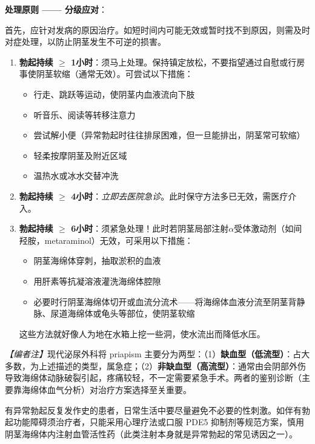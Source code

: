 \documentclass[12pt,a4paper,twoside]{ctexbook}
\begin{document}
\vspace{0.5em}
\noindent\textbf{处理原则 —— 分级应对}：

首先，应针对发病的原因治疗。如短时间内可能无效或暂时找不到原因，则需及时对症处理，以防止阴茎发生不可逆的损害。

\begin{enumerate}
	\item \textbf{勃起持续 $\geq$ 1小时}：须马上处理。保持镇定放松，不要指望通过自慰或行房事使阴茎软缩（通常无效）。可尝试以下措施：
	\begin{itemize}
		\item 行走、跳跃等运动，使阴茎内血液流向下肢
		\item 听音乐、阅读等转移注意力
		\item 尝试解小便（异常勃起时往往排尿困难，但一旦能排出，阴茎常可软缩）
		\item 轻柔按摩阴茎及附近区域
		\item 温热水或冰水交替冲洗
	\end{itemize}

	\item \textbf{勃起持续 $\geq$ 4小时}：\textit{立即去医院急诊}。此时保守方法多已无效，需医疗介入。

	\item \textbf{勃起持续 $\geq$ 6小时}：须紧急处理！此时若阴茎局部注射$\alpha$受体激动剂（如间羟胺，metaraminol）无效，可采用以下措施：
	\begin{itemize}
		\item 阴茎海绵体穿刺，抽取淤积的血液
		\item 用肝素等抗凝溶液灌洗海绵体腔隙
		\item 必要时行阴茎海绵体切开或血流分流术——将海绵体血液分流至阴茎背静脉、尿道海绵体或龟头等部位，使阴茎软缩
	\end{itemize}
	这些方法就好像人为地在水箱上挖一些洞，使水流出而降低水压。
\end{enumerate}

\noindent\textit{【编者注】}现代泌尿外科将 priapism 主要分为两型：（1）\textbf{缺血型（低流型）}：占大多数，为上述描述的类型，属急症；（2）\textbf{非缺血型（高流型）}：通常由会阴部外伤导致海绵体动脉破裂引起，疼痛较轻，不一定需要紧急手术。两者的鉴别诊断（主要靠海绵体血气分析）对治疗方案选择至关重要。

\begin{tcolorbox}[colback=pink!5!white,colframe=red!50!black,title=贴心小叮咛]
有异常勃起反复发作史的患者，日常生活中要尽量避免不必要的性刺激。如伴有勃起功能障碍须治疗者，只能采用心理疗法或口服 PDE5 抑制剂等规范方案，慎用阴茎海绵体内注射血管活性药（此类注射本身就是异常勃起的常见诱因之一）。
\end{tcolorbox}
\end{document}
